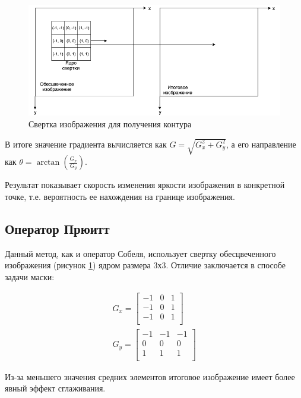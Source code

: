 \begin{figure}[!h]
	\centering
	\includegraphics[width=\textwidth,keepaspectratio]{figures/ru/sobel.png}
	\caption{Свертка изображения для получения контура}
	\label{fig:sobel}
\end{figure}

В итоге значение градиента вычисляется как $G=\sqrt{G_x^2+G_y^2}$, а его направление как $\theta=\arctan(\frac{G_x}{G_y})$.

Результат показывает скорость изменения яркости изображения в конкретной точке, т.е. вероятность ее нахождения на границе изображения.

\subsection{Оператор Прюитт}

Данный метод\cite{Prewitt}, как и оператор Собеля, использует свертку обесцвеченного изображения (рисунок \ref{fig:sobel}) ядром размера 3х3. Отличие заключается в способе задачи маски:

\begin{eqnarray}\label{eq:prewitt-matrixs}
G_x = \begin{bmatrix}
-1 & 0 & 1\\
-1 & 0 & 1\\
-1 & 0 & 1\\
\end{bmatrix} \\
G_y = \begin{bmatrix}
-1 & -1 & -1\\
0 & 0 & 0\\
1 & 1 & 1\\
\end{bmatrix}
\end{eqnarray}

Из-за меньшего значения средних элементов итоговое изображение имеет более явный эффект сглаживания.


